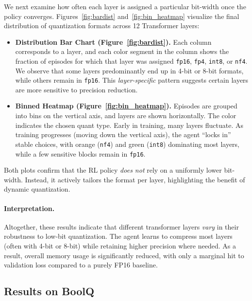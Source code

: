 \documentclass{article}
\begin{document}
	We next examine how often each layer is assigned a particular bit-width once the policy converges. Figures~\ref{fig:bardist} and~\ref{fig:bin_heatmap} visualize the final distribution of quantization formats across 12 Transformer layers:
	\begin{itemize}
		\item \textbf{Distribution Bar Chart (Figure~\ref{fig:bardist}).} Each column corresponds to a layer, and each color segment in the column shows the fraction of episodes for which that layer was assigned \texttt{fp16}, \texttt{fp4}, \texttt{int8}, or \texttt{nf4}. We observe that some layers predominantly end up in 4-bit or 8-bit formats, while others remain in \texttt{fp16}. This \emph{layer-specific} pattern suggests certain layers are more sensitive to precision reduction.
		\item \textbf{Binned Heatmap (Figure~\ref{fig:bin_heatmap}).} Episodes are grouped into bins on the vertical axis, and layers are shown horizontally. The color indicates the chosen quant type. Early in training, many layers fluctuate. As training progresses (moving down the vertical axis), the agent “locks in” stable choices, with orange (\texttt{nf4}) and green (\texttt{int8}) dominating most layers, while a few sensitive blocks remain in \texttt{fp16}.
	\end{itemize}
	Both plots confirm that the RL policy \emph{does not} rely on a uniformly lower bit-width. Instead, it actively tailors the format per layer, highlighting the benefit of dynamic quantization.
	
	\paragraph{Interpretation.}
	Altogether, these results indicate that different transformer layers \emph{vary} in their robustness to low-bit quantization. The agent learns to compress most layers (often with 4-bit or 8-bit) while retaining higher precision where needed. As a result, overall memory usage is significantly reduced, with only a marginal hit to validation loss compared to a purely FP16 baseline.
			
	\subsection{Results on BoolQ}
	
\end{document}
